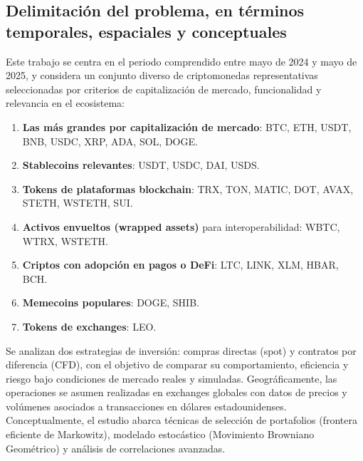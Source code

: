 \documentclass[12pt,letterpaper]{article}   %
\begin{document}
\subsection{Delimitación del problema, en términos temporales, espaciales y conceptuales}
Este trabajo se centra en el periodo comprendido entre mayo de 2024 y mayo de 2025, y considera un conjunto diverso de criptomonedas representativas seleccionadas por criterios de capitalización de mercado, funcionalidad y relevancia en el ecosistema:

\begin{enumerate}
\item \textbf{Las más grandes por capitalización de mercado}: BTC, ETH, USDT, BNB, USDC, XRP, ADA, SOL, DOGE.
\item \textbf{Stablecoins relevantes}: USDT, USDC, DAI, USDS.
\item \textbf{Tokens de plataformas blockchain}: TRX, TON, MATIC, DOT, AVAX, STETH, WSTETH, SUI.
\item \textbf{Activos envueltos (wrapped assets)} para interoperabilidad: WBTC, WTRX, WSTETH.
\item \textbf{Criptos con adopción en pagos o DeFi}: LTC, LINK, XLM, HBAR, BCH.
\item \textbf{Memecoins populares}: DOGE, SHIB.
\item \textbf{Tokens de exchanges}: LEO.
\end{enumerate}

Se analizan dos estrategias de inversión: compras directas (spot) y contratos por diferencia (CFD), con el objetivo de comparar su comportamiento, eficiencia y riesgo bajo condiciones de mercado reales y simuladas. Geográficamente, las operaciones se asumen realizadas en exchanges globales con datos de precios y volúmenes asociados a transacciones en dólares estadounidenses. Conceptualmente, el estudio abarca técnicas de selección de portafolios (frontera eficiente de Markowitz), modelado estocástico (Movimiento Browniano Geométrico) y análisis de correlaciones avanzadas.
\end{document}
